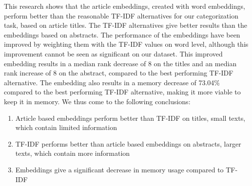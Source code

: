 \documentclass[../../Thesis.tex]{subfiles}
\begin{document}
This research shows that the article embeddings, created with word embeddings, perform better than the reasonable TF-IDF alternatives for our categorization task, based on article titles. The TF-IDF alternatives give better results than the embeddings based on abstracts. The performance of the embeddings have been improved by weighting them with the TF-IDF values on word level, although this improvement cannot be seen as significant on our dataset. This improved embedding results in a median rank decrease of 8 on the titles and an median rank increase of 8 on the abstract, compared to the best performing TF-IDF alternative.  The embedding also results in a memory decrease of 73.04\% compared to the best performing TF-IDF alternative, making it more viable to keep it in memory. We thus come to the following conclusions:
\begin{enumerate}
\item{Article based embeddings perform better than TF-IDF on titles, small texts, which contain limited information}
\item{TF-IDF performs better than article based embeddings on abstracts, larger texts, which contain more information}
\item{Embeddings give a significant decrease in memory usage compared to TF-IDF}
\end{enumerate}
\end{document}
